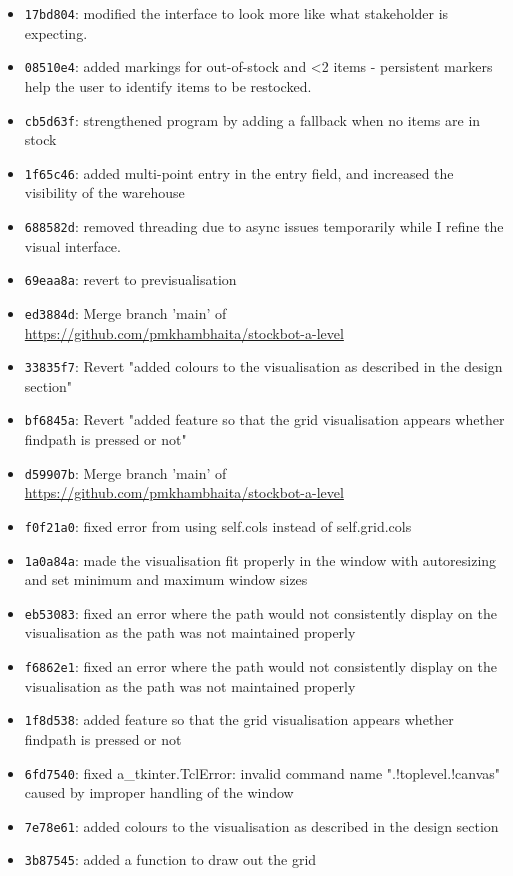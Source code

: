 \begin{itemize}
	\item \texttt{17bd804}: modified the interface to look more like what stakeholder is expecting.
	\item \texttt{08510e4}: added markings for out-of-stock and <2 items - persistent markers help the user to identify items to be restocked.
	\item \texttt{cb5d63f}: strengthened program by adding a fallback when no items are in stock
	\item \texttt{1f65c46}: added multi-point entry in the entry field, and increased the visibility of the warehouse
	\item \texttt{688582d}: removed threading due to async issues temporarily while I refine the visual interface.
	\item \texttt{69eaa8a}: revert to previsualisation
	\item \texttt{ed3884d}: Merge branch 'main' of \url{https://github.com/pmkhambhaita/stockbot-a-level}
	\item \texttt{33835f7}: Revert "added colours to the visualisation as described in the design section"
	\item \texttt{bf6845a}: Revert "added feature so that the grid visualisation appears whether findpath is pressed or not"
	\item \texttt{d59907b}: Merge branch 'main' of \url{https://github.com/pmkhambhaita/stockbot-a-level}
	\item \texttt{f0f21a0}: fixed error from using self.cols instead of self.grid.cols
	\item \texttt{1a0a84a}: made the visualisation fit properly in the window with autoresizing and set minimum and maximum window sizes
	\item \texttt{eb53083}: fixed an error where the path would not consistently display on the visualisation as the path was not maintained properly
	\item \texttt{f6862e1}: fixed an error where the path would not consistently display on the visualisation as the path was not maintained properly
	\item \texttt{1f8d538}: added feature so that the grid visualisation appears whether findpath is pressed or not
	\item \texttt{6fd7540}: fixed a\_tkinter.TclError: invalid command name ".!toplevel.!canvas" caused by improper handling of the window
	\item \texttt{7e78e61}: added colours to the visualisation as described in the design section
	\item \texttt{3b87545}: added a function to draw out the grid

\end{itemize}
